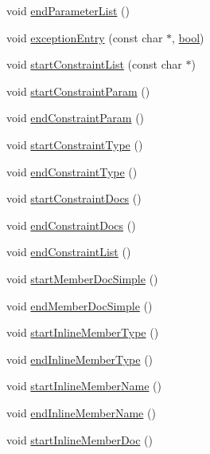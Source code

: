 \begin{DoxyCompactItemize}
void \hyperlink{class_r_t_f_generator_a14ea701758cd22aac57c4701b91b3094}{end\+Parameter\+List} ()
\item 
void \hyperlink{class_r_t_f_generator_abf4fe54e26bf5f3e362cab1f0825b6a5}{exception\+Entry} (const char $\ast$, \hyperlink{qglobal_8h_a1062901a7428fdd9c7f180f5e01ea056}{bool})
\item 
void \hyperlink{class_r_t_f_generator_a2f057ad3fcf66b3c6a736fe1bc0c891c}{start\+Constraint\+List} (const char $\ast$)
\item 
void \hyperlink{class_r_t_f_generator_a0dece267723511baafa87912d4a348f5}{start\+Constraint\+Param} ()
\item 
void \hyperlink{class_r_t_f_generator_a0f1f278d86d5c44964308faaaea24b1b}{end\+Constraint\+Param} ()
\item 
void \hyperlink{class_r_t_f_generator_a8e83a67681925ae6b55615edcca9c265}{start\+Constraint\+Type} ()
\item 
void \hyperlink{class_r_t_f_generator_a8bdab63308f7a7ee418e03264f03bbc3}{end\+Constraint\+Type} ()
\item 
void \hyperlink{class_r_t_f_generator_a8ea3d45327f68ad2e47a4e5298602f9d}{start\+Constraint\+Docs} ()
\item 
void \hyperlink{class_r_t_f_generator_a24addae2fe4889afd85e29b6a19829fd}{end\+Constraint\+Docs} ()
\item 
void \hyperlink{class_r_t_f_generator_ac2a79257f2d23883d6254038588a2267}{end\+Constraint\+List} ()
\item 
void \hyperlink{class_r_t_f_generator_ad6e9c55c3c64a4b8f635eb8817bf10ea}{start\+Member\+Doc\+Simple} ()
\item 
void \hyperlink{class_r_t_f_generator_ace3134035ce9c2fb226778477bdf9428}{end\+Member\+Doc\+Simple} ()
\item 
void \hyperlink{class_r_t_f_generator_a28120fbd546b11d4d783b1752d9b3bfa}{start\+Inline\+Member\+Type} ()
\item 
void \hyperlink{class_r_t_f_generator_a1dc76b499c4addde663e6c07abad3083}{end\+Inline\+Member\+Type} ()
\item 
void \hyperlink{class_r_t_f_generator_ae83e7d998c1bae062c0d0ac838a4227b}{start\+Inline\+Member\+Name} ()
\item 
void \hyperlink{class_r_t_f_generator_a561f25430fb6b34b5c014cf63a183ead}{end\+Inline\+Member\+Name} ()
\item 
void \hyperlink{class_r_t_f_generator_af4b8acfdf0cb5e33d0760a6bdde6322d}{start\+Inline\+Member\+Doc} ()
\item 

\end{DoxyCompactItemize}
